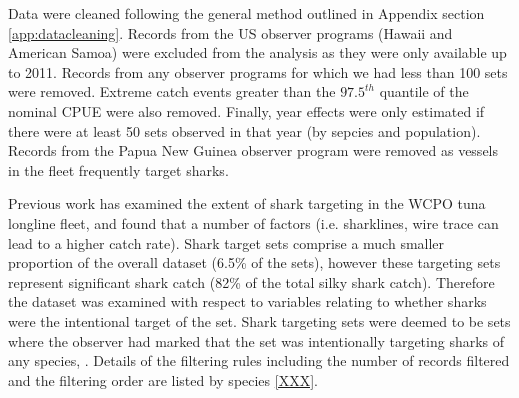 Data were cleaned following the general method outlined in Appendix section \ref{app:datacleaning}. Records from the US observer programs (Hawaii and American Samoa) were excluded from the analysis as they were only available up to 2011. Records from any observer programs for which we had less than 100 sets were removed. Extreme catch events greater than the $97.5^{th}$ quantile of the nominal CPUE were also removed. Finally, year effects were only estimated if there were at least 50 sets observed in that year (by sepcies and population).  Records from the Papua New Guinea observer program were removed as vessels in the fleet frequently target sharks.
                                                                                      
Previous work \citep{Rice2012_a, Rice2013_a, Bromhead et al 1012} has examined the extent of shark targeting in the WCPO tuna longline fleet, and found that a number of factors (i.e. sharklines, wire trace can lead to a higher catch rate). Shark target sets comprise a much smaller proportion of the overall dataset (6.5\% of the sets), however these targeting sets represent significant shark catch (82\% of the total silky shark catch). Therefore the dataset was examined with respect to variables relating to whether sharks were the intentional target of the set.                                                                                      
Shark targeting sets were deemed to be sets where the observer had marked that the set was intentionally targeting sharks of any species, . %
Details of the  filtering rules including the number of records filtered and the filtering  order    are listed by species  \ref{XXX}. 
                                                                                       
